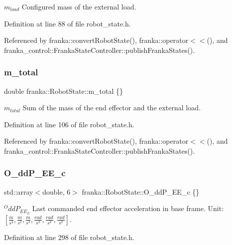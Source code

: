 $m_{load}$ Configured mass of the external load. 

Definition at line 88 of file robot\+\_\+state.\+h.



Referenced by franka\+::convert\+Robot\+State(), franka\+::operator$<$$<$(), and franka\+\_\+control\+::\+Franka\+State\+Controller\+::publish\+Franka\+States().

\mbox{\label{structfranka_1_1RobotState_a87880d4693c8f576ebdabf00f4d4f981}} 
\subsubsection{\texorpdfstring{m\+\_\+total}{m\_total}}
{\footnotesize\ttfamily double franka\+::\+Robot\+State\+::m\+\_\+total \{\}}

$m_{total}$ Sum of the mass of the end effector and the external load. 

Definition at line 106 of file robot\+\_\+state.\+h.



Referenced by franka\+::convert\+Robot\+State(), franka\+::operator$<$$<$(), and franka\+\_\+control\+::\+Franka\+State\+Controller\+::publish\+Franka\+States().

\mbox{\label{structfranka_1_1RobotState_ac8dfcf78ddbb27852484e921d6d66ca1}} 
\subsubsection{\texorpdfstring{O\+\_\+dd\+P\+\_\+\+E\+E\+\_\+c}{O\_ddP\_EE\_c}}
{\footnotesize\ttfamily std\+::array$<$double, 6$>$ franka\+::\+Robot\+State\+::\+O\+\_\+dd\+P\+\_\+\+E\+E\+\_\+c \{\}}

${^OddP_{EE}}_{c}$ Last commanded end effector acceleration in base frame. Unit\+: $[\frac{m}{s^2},\frac{m}{s^2},\frac{m}{s^2},\frac{rad}{s^2},\frac{rad}{s^2},\frac{rad}{s^2}]$. 

Definition at line 298 of file robot\+\_\+state.\+h.



